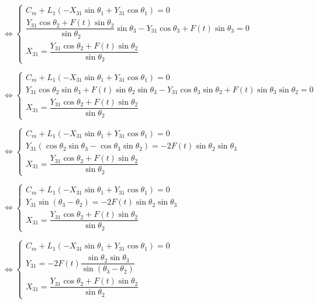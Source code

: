 \begin{multicols}{2}
\begin{corrige}
$\Leftrightarrow \left\{\begin{array}{l}
 C_m + L_1\left(-X_{31}\sin \theta_1+Y_{31} \cos \theta_1 \right) =0 \\
\dfrac{Y_{31}\cos\theta_2+ F(t)\sin \theta_2}{\sin \theta_2} \sin \theta_3-Y_{31}\cos \theta_3   +F(t)\sin\theta_3=0 \\
 X_{31} = \dfrac{Y_{31}\cos\theta_2+ F(t)\sin \theta_2}{\sin \theta_2}
\end{array}
\right.
$

$\Leftrightarrow \left\{\begin{array}{l}
 C_m + L_1\left(-X_{31}\sin \theta_1+Y_{31} \cos \theta_1 \right) =0 \\
Y_{31}\cos\theta_2\sin \theta_3+ F(t)\sin \theta_2 \sin \theta_3-Y_{31}\cos \theta_3\sin \theta_2   +F(t)\sin\theta_3\sin \theta_2=0 \\
 X_{31} = \dfrac{Y_{31}\cos\theta_2+ F(t)\sin \theta_2}{\sin \theta_2}
\end{array}
\right.
$

$\Leftrightarrow \left\{\begin{array}{l}
 C_m + L_1\left(-X_{31}\sin \theta_1+Y_{31} \cos \theta_1 \right) =0 \\
Y_{31}\left(\cos\theta_2\sin \theta_3-\cos \theta_3\sin \theta_2 \right)  =-2F(t)\sin \theta_2\sin\theta_3  \\
 X_{31} = \dfrac{Y_{31}\cos\theta_2+ F(t)\sin \theta_2}{\sin \theta_2}
\end{array}
\right.
$



$\Leftrightarrow \left\{\begin{array}{l}
 C_m + L_1\left(-X_{31}\sin \theta_1+Y_{31} \cos \theta_1 \right) =0 \\
Y_{31}\sin \left(\theta_3-\theta_2 \right)  =-2F(t)\sin \theta_2\sin\theta_3  \\
 X_{31} = \dfrac{Y_{31}\cos\theta_2+ F(t)\sin \theta_2}{\sin \theta_2}
\end{array}
\right.
$


$\Leftrightarrow \left\{\begin{array}{l}
 C_m + L_1\left(-X_{31}\sin \theta_1+Y_{31} \cos \theta_1 \right) =0 \\
Y_{31}  =-2F(t)\dfrac{\sin \theta_2\sin\theta_3}{\sin \left(\theta_3-\theta_2 \right)}  \\
 X_{31} = \dfrac{Y_{31}\cos\theta_2+ F(t)\sin \theta_2}{\sin \theta_2}
\end{array}
\right.
$


\end{corrige}
\end{multicols}
